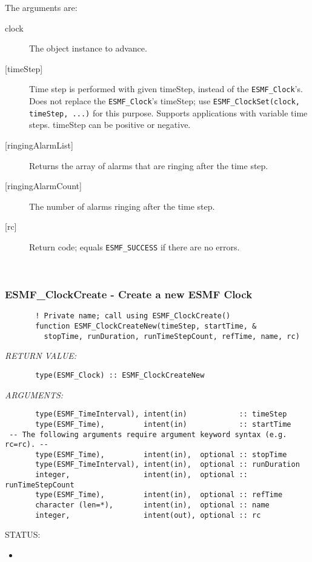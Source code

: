        The arguments are:
       \begin{description}
       \item[clock]
            The object instance to advance.
       \item[{[timeStep]}]
            Time step is performed with given timeStep, instead of
            the {\tt ESMF\_Clock}'s.  Does not replace the {\tt ESMF\_Clock}'s
            timeStep; use {\tt ESMF\_ClockSet(clock, timeStep, ...)} for
            this purpose.  Supports applications with variable time steps.
            timeStep can be positive or negative.
       \item[{[ringingAlarmList]}]
            Returns the array of alarms that are ringing after the
            time step.
       \item[{[ringingAlarmCount]}]
            The number of alarms ringing after the time step.
       \item[{[rc]}]
            Return code; equals {\tt ESMF\_SUCCESS} if there are no errors.
       \end{description}
   
 
\mbox{}\hrulefill\ 
 
\subsubsection [ESMF\_ClockCreate] {ESMF\_ClockCreate - Create a new ESMF Clock}


 
\begin{verbatim}       ! Private name; call using ESMF_ClockCreate()
       function ESMF_ClockCreateNew(timeStep, startTime, &
         stopTime, runDuration, runTimeStepCount, refTime, name, rc)
 \end{verbatim}{\em RETURN VALUE:}
\begin{verbatim}       type(ESMF_Clock) :: ESMF_ClockCreateNew
 \end{verbatim}{\em ARGUMENTS:}
\begin{verbatim}       type(ESMF_TimeInterval), intent(in)            :: timeStep
       type(ESMF_Time),         intent(in)            :: startTime
 -- The following arguments require argument keyword syntax (e.g. rc=rc). --
       type(ESMF_Time),         intent(in),  optional :: stopTime
       type(ESMF_TimeInterval), intent(in),  optional :: runDuration
       integer,                 intent(in),  optional :: runTimeStepCount
       type(ESMF_Time),         intent(in),  optional :: refTime
       character (len=*),       intent(in),  optional :: name
       integer,                 intent(out), optional :: rc
 \end{verbatim}
{\sf STATUS:}
   \begin{itemize}
   \item{}
   \end{itemize}
  
